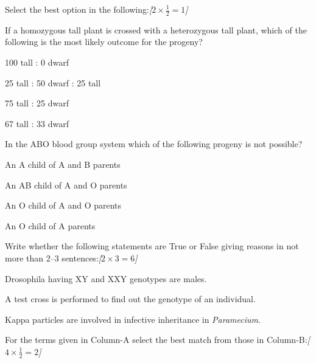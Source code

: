 \documentclass[11pt,a4paper]{article}
\newcommand{\pts}[1]{\hfill   \textit{[#1]}}
\begin{document}
\begin{parts}
  \item Select the best option in the following:\pts{$2  \times \frac{1}{2} = 1$}
  
\begin{parts}
    \item If a homozygous tall plant is crossed with a heterozygous tall plant, which of the following is the most likely outcome for the progeny?
    
\begin{parts}
      \item 100 tall : 0 dwarf
      \item 25 tall : 50 dwarf : 25 tall
      \item 75 tall : 25 dwarf
      \item 67 tall : 33 dwarf
    \end{parts}
    
    \item In the ABO blood group system which of the following progeny is not possible?
    
\begin{parts}
      \item An A child of A and B parents
      \item An AB child of A and O parents
      \item An O child of A and O parents
      \item An O child of A parents
    \end{parts}
  \end{parts}
  
  \item Write whether the following statements are True or False giving reasons in not more than 2--3 sentences:\pts{$2  \times 3 = 6$}
  
\begin{parts}
    \item Drosophila having XY and XXY genotypes are males.
    \item A test cross is performed to find out the genotype of an individual.
    \item Kappa particles are involved in infective inheritance in   \textit{Paramecium}.
  \end{parts}

  \item For the terms given in Column-A select the best match from those in Column-B:\pts{$4  \times \frac{1}{2} = 2$}
  
\begin{center}
    

\end{center}
\end{parts}
\end{document}
